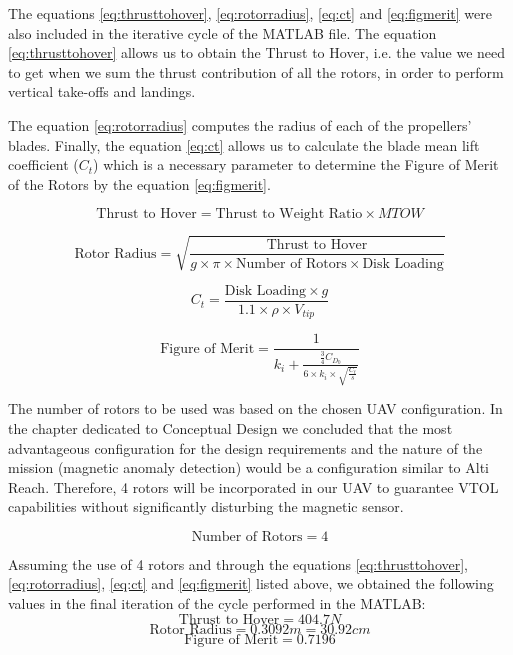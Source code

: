 \documentclass[english,fira]{ist-report}
\begin{document}
The equations \ref{eq:thrusttohover}, \ref{eq:rotorradius}, \ref{eq:ct} and \ref{eq:figmerit} were also included in the iterative cycle of the MATLAB file. The equation \ref{eq:thrusttohover} allows us to obtain the Thrust to Hover, i.e. the value we need to get when we sum the thrust contribution of all the rotors, in order to perform vertical take-offs and landings.  \par
The equation \ref{eq:rotorradius} computes the radius of each of the propellers’ blades. Finally, the equation \ref{eq:ct} allows us to calculate the blade mean lift coefficient ($C_t$) which is a necessary parameter to determine the Figure of Merit of the Rotors by the equation \ref{eq:figmerit}.

\begin{equation} \label{eq:thrusttohover}
    \text{Thrust to Hover}=\text{Thrust to Weight Ratio}\times MTOW
\end{equation}

\begin{equation} \label{eq:rotorradius}
    \text{Rotor Radius}=\sqrt{\frac{\text{Thrust to Hover}}{g\times\pi\times \text{Number of Rotors} \times \text{Disk Loading}}}
\end{equation}

\begin{equation} \label{eq:ct}
    C_t=\frac{\text{Disk Loading}\times g}{1.1\times\rho\times V_{tip}}
\end{equation}

\begin{equation} \label{eq:figmerit}
    \text{Figure of Merit}=\frac{1}{k_i+\frac{\frac{3}{4}C_{D_0}}{6\times k_i\times\sqrt{\frac{C_t}{s}}}}
\end{equation}


The number of rotors to be used was based on the chosen UAV configuration. In the chapter dedicated to Conceptual Design we concluded that the most advantageous configuration for the design requirements and the nature of the mission (magnetic anomaly detection) would be a configuration similar to Alti Reach. Therefore, 4 rotors will be incorporated in our UAV to guarantee VTOL capabilities without significantly disturbing the magnetic sensor.

\begin{equation*}
    \text{Number of Rotors} = 4
\end{equation*}

Assuming the use of 4 rotors and through the equations \ref{eq:thrusttohover},\ref{eq:rotorradius}, \ref{eq:ct} and \ref{eq:figmerit} listed above, we obtained the following values in the final iteration of the cycle performed in the MATLAB:
\begin{equation*}
    \text{Thrust to Hover}=404.7N
\end{equation*}
\begin{equation*}
    \text{Rotor Radius}=0.3092m= 30.92cm
\end{equation*}
\begin{equation*}
    \text{Figure of Merit}=0.7196
\end{equation*}
\end{document}
